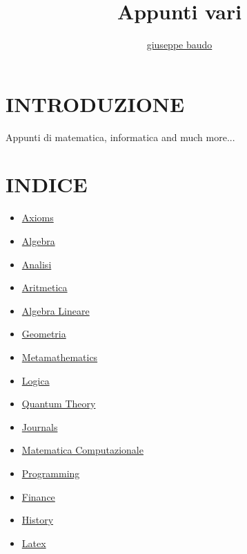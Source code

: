 \documentclass[a4paper,10pt]{article}
\title{Appunti vari}
\author{\href{http://www.baudo.hol.es}{giuseppe baudo}}
\begin{document}
\maketitle

\section{INTRODUZIONE}
Appunti di matematica, informatica and much more...

\section{INDICE}
\begin{itemize}
  \item \href{Axioms.html}{Axioms}
  \item \href{AlgebraIndex.html}{Algebra}
  \item \href{Analisi.html}{Analisi} 
  \item \href{Aritmetica.html}{Aritmetica}
  \item \href{AlgebraLineare.html}{Algebra Lineare}
  \item \href{Geometria.html}{Geometria}
  \item \href{Metamathematics.html}{Metamathematics}
  \item \href{Logics.html}{Logica}
  \item \href{QuantumTheory.html}{Quantum Theory}
  \item \href{Journals.html}{Journals}
  \item \href{MatematicaComputazionale.html}{Matematica Computazionale}
  \item \href{Programming.html}{Programming}
  \item \href{finance.html}{Finance} 
  \item \href{history.html}{History} 
  \item \href{latex.html}{Latex} 
  
\end{itemize}
\end{document}
